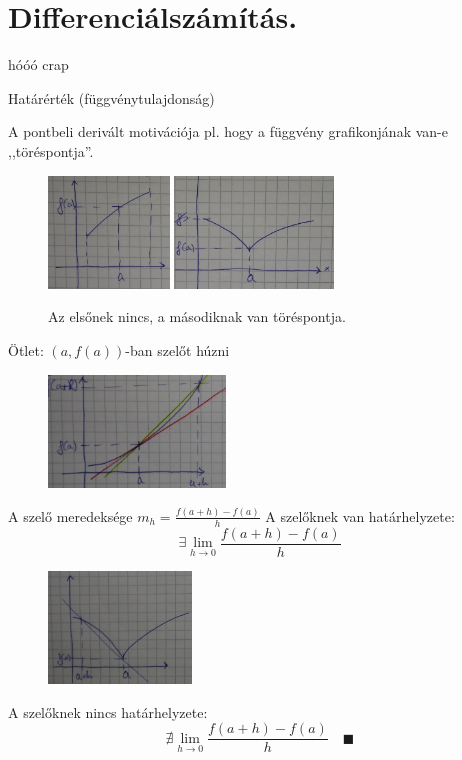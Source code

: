 \documentclass[a4paper,11.5pt]{article}
\begin{document}
	\section{Differenciálszámítás.}
	\begin{note}
		hóóó crap
	\end{note}
	\begin{revision}
		Határérték (függvénytulajdonság)
	\end{revision}
	A pontbeli derivált motivációja pl. hogy a függvény grafikonjának van-e ,,töréspontja''.
	\begin{figure}[H]
		\centering
		\includegraphics[height=3cm]{kepek/03ea_12a.jpg}\quad \quad \quad 
		\includegraphics[height=3cm]{kepek/03ea_12b.jpg}
		\caption{Az elsőnek nincs, a másodiknak van töréspontja.}\label{}
	\end{figure}
	Ötlet: $(a,f(a))$-ban szelőt húzni
	\begin{figure}[H]
		\centering
		\includegraphics[height=3cm]{kepek/03ea_13.jpg}
		\caption{}\label{}
	\end{figure}
	A szelő meredeksége $m_h=\frac{f(a+h)-f(a)}{h}$ A szelőknek van határhelyzete:
	\[ \exists\lim_{h\to0}\frac{f(a+h)-f(a)}{h} \]
	\begin{figure}[H]
		\centering
		\includegraphics[height=3cm]{kepek/03ea_14.jpg}
		\caption{}\label{}
	\end{figure}
	A szelőknek nincs határhelyzete:
	\[ \nexists\lim_{h\to0}\frac{f(a+h)-f(a)}{h}\quad \blacksquare \]
\end{document}
